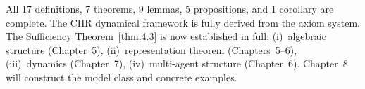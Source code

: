 \medskip
\noindent
All 17 definitions, 7 theorems, 9 lemmas, 5 propositions, and 1
corollary are complete.  The CIIR dynamical framework is fully derived
from the axiom system.  The Sufficiency Theorem~\ref{thm:4.3} is now
established in full: (i)~algebraic structure (Chapter~5),
(ii)~representation theorem (Chapters~5--6), (iii)~dynamics
(Chapter~7), (iv)~multi-agent structure (Chapter~6).
Chapter~8 will construct the model class and concrete examples.
